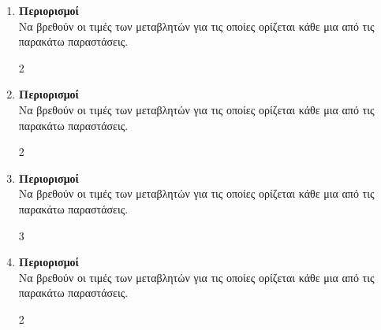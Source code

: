 \documentclass[11pt,a4paper,modern]{FFExercises}
\begin{document}
\begin{enumerate}[resume]
\item \textbf{Περιορισμοί}\\
Να βρεθούν οι τιμές των μεταβλητών για τις οποίες ορίζεται κάθε μια από τις παρακάτω παραστάσεις.
\begin{multicols}{2}
\end{multicols}

\item \textbf{Περιορισμοί}\\
Να βρεθούν οι τιμές των μεταβλητών για τις οποίες ορίζεται κάθε μια από τις παρακάτω παραστάσεις.
\begin{multicols}{2}
\end{multicols}

\item \textbf{Περιορισμοί}\\
Να βρεθούν οι τιμές των μεταβλητών για τις οποίες ορίζεται κάθε μια από τις παρακάτω παραστάσεις.
\begin{multicols}{3}
\end{multicols}

\item \textbf{Περιορισμοί}\\
Να βρεθούν οι τιμές των μεταβλητών για τις οποίες ορίζεται κάθε μια από τις παρακάτω παραστάσεις.
\begin{multicols}{2}
\end{multicols}


\end{enumerate}
\end{document}
